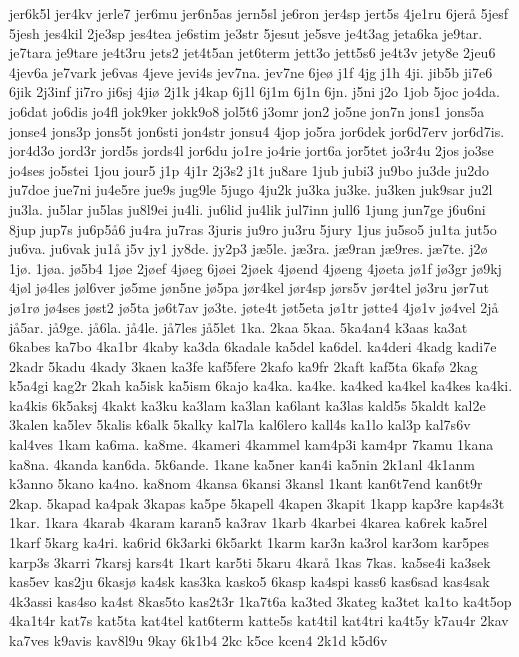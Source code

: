 {jer6k5l
jer4kv
jerle7
jer6mu
jer6n5as
jern5sl
je6ron
jer4sp
jert5s
4je1ru
6jerå
5jesf
5jesh
jes4kil
2je3sp
jes4tea
je6stim
je3str
5jesut
je5sve
je4t3ag
jeta6ka
je9tar.
je7tara
je9tare
je4t3ru
jets2
jet4t5an
jet6term
jett3o
jett5s6
je4t3v
jety8e
2jeu6
4jev6a
je7vark
je6vas
4jeve
jevi4s
jev7na.
jev7ne
6jeø
j1f
4jg
j1h
4ji.
jib5b
ji7e6
6jik
2j3inf
ji7ro
ji6sj
4jiø
2j1k
j4kap
6j1l
6j1m
6j1n
6jn.
j5ni
j2o
1job
5joc
jo4da.
jo6dat
jo6dis
jo4fl
jok9ker
jokk9o8
jol5t6
j3omr
jon2
jo5ne
jon7n
jons1
jons5a
jonse4
jons3p
jons5t
jon6sti
jon4str
jonsu4
4jop
jo5ra
jor6dek
jor6d7erv
jor6d7is.
jor4d3o
jord3r
jord5s
jords4l
jor6du
jo1re
jo4rie
jort6a
jor5tet
jo3r4u
2jos
jo3se
jo4ses
jo5stei
1jou
jour5
j1p
4j1r
2j3s2
j1t
ju8are
1jub
jubi3
ju9bo
ju3de
ju2do
ju7doe
jue7ni
ju4e5re
jue9s
jug9le
5jugo
4ju2k
ju3ka
ju3ke.
ju3ken
juk9sar
ju2l
ju3la.
ju5lar
ju5las
ju8l9ei
ju4li.
ju6lid
ju4lik
jul7inn
jull6
1jung
jun7ge
j6u6ni
8jup
jup7s
ju6p5å6
ju4ra
ju7ras
3juris
ju9ro
ju3ru
5jury
1jus
ju5so5
ju1ta
jut5o
ju6va.
ju6vak
ju1å
j5v
jy1
jy8de.
jy2p3
jæ5le.
jæ3ra.
jæ9ran
jæ9res.
jæ7te.
j2ø
1jø.
1jøa.
jø5b4
1jøe
2jøef
4jøeg
6jøei
2jøek
4jøend
4jøeng
4jøeta
jø1f
jø3gr
jø9kj
4jøl
jø4les
jøl6ver
jø5me
jøn5ne
jø5pa
jør4kel
jør4sp
jørs5v
jør4tel
jø3ru
jør7ut
jø1rø
jø4ses
jøst2
jø5ta
jø6t7av
jø3te.
jøte4t
jøt5eta
jø1tr
jøtte4
4jø1v
jø4vel
2jå
jå5ar.
jå9ge.
jå6la.
jå4le.
jå7les
jå5let
1ka.
2kaa
5kaa.
5ka4an4
k3aas
ka3at
6kabes
ka7bo
4ka1br
4kaby
ka3da
6kadale
ka5del
ka6del.
ka4deri
4kadg
kadi7e
2kadr
5kadu
4kady
3kaen
ka3fe
kaf5fere
2kafo
ka9fr
2kaft
kaf5ta
6kafø
2kag
k5a4gi
kag2r
2kah
ka5isk
ka5ism
6kajo
ka4ka.
ka4ke.
ka4ked
ka4kel
ka4kes
ka4ki.
ka4kis
6k5aksj
4kakt
ka3ku
ka3lam
ka3lan
ka6lant
ka3las
kald5s
5kaldt
kal2e
3kalen
ka5lev
5kalis
k6alk
5kalky
kal7la
kal6lero
kall4s
ka1lo
kal3p
kal7s6v
kal4ves
1kam
ka6ma.
ka8me.
4kameri
4kammel
kam4p3i
kam4pr
7kamu
1kana
ka8na.
4kanda
kan6da.
5k6ande.
1kane
ka5ner
kan4i
ka5nin
2k1anl
4k1anm
k3anno
5kano
ka4no.
ka8nom
4kansa
6kansi
3kansl
1kant
kan6t7end
kan6t9r
2kap.
5kapad
ka4pak
3kapas
ka5pe
5kapell
4kapen
3kapit
1kapp
kap3re
kap4s3t
1kar.
1kara
4karab
4karam
karan5
ka3rav
1karb
4karbei
4karea
ka6rek
ka5rel
1karf
5karg
ka4ri.
ka6rid
6k3arki
6k5arkt
1karm
kar3n
ka3rol
kar3om
kar5pes
karp3s
3karri
7karsj
kars4t
1kart
kar5ti
5karu
4karå
1kas
7kas.
ka5se4i
ka3sek
kas5ev
kas2ju
6kasjø
ka4sk
kas3ka
kasko5
6kasp
ka4spi
kass6
kas6sad
kas4sak
4k3assi
kas4so
ka4st
8kas5to
kas2t3r
1ka7t6a
ka3ted
3kateg
ka3tet
ka1to
ka4t5op
4ka1t4r
kat7s
kat5ta
kat4tel
kat6term
katte5s
kat4til
kat4tri
ka4t5y
k7au4r
2kav
ka7ves
k9avis
kav8l9u
9kay
6k1b4
2kc
k5ce
kcen4
2k1d
k5d6v
}
